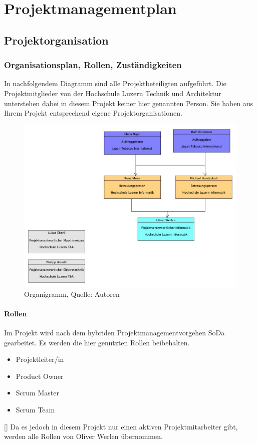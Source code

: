 
\section{Projektmanagementplan}\label{Projektmanagementplan}

\subsection{Projektorganisation}
\subsubsection{Organisationsplan, Rollen, Zuständigkeiten}
In nachfolgendem Diagramm sind alle Projektbeteiligten aufgeführt. Die Projektmitglieder von der Hochschule Luzern Technik und Architektur unterstehen dabei in diesem Projekt keiner hier genannten Person. Sie haben aus Ihrem Projekt entsprechend eigene Projektorganisationen. 
\begin{figure}[H]
    \centering
    \includegraphics[width=1\textwidth]{images/Organigramm_BAA.jpg}
    \caption[Organigramm]{Organigramm, Quelle: Autoren}
    \label{img: OrganigrammWiPro}
\end{figure}	

\paragraph{Rollen}
Im Projekt wird nach dem hybriden Projektmanagementvorgehen \ac{SoDa} gearbeitet. Es werden die hier genutzten Rollen beibehalten. 
\begin{itemize}
	\item Projektleiter/in
	\item Product Owner
	\item Scrum Master
	\item Scrum Team
\end{itemize}
[\cite{sodaHSLU}]
Da es jedoch in diesem Projekt nur einen aktiven Projektmitarbeiter gibt, werden alle Rollen von Oliver Werlen übernommen. 

